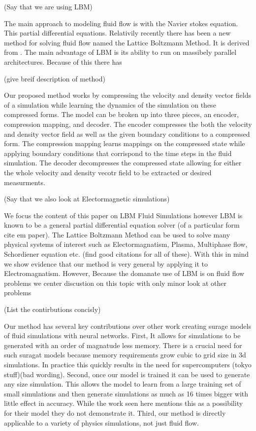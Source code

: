 \documentclass{article}
\begin{document}
(Say that we are using LBM)

The main approach to modeling fluid flow is with the Navier stokes equation. This partial differential equations. Relativily recently there has been a new method for solving fluid flow named the Lattice Boltzmann Method. It is derived from . The main advantage of LBM is its ability to run on massibely parallel architectures. Because of this there has 

(give breif description of method)

Our proposed method works by compressing the velocity and density vector fields of a simulation while learning the dynamics of the simulation on these compressed forms. The model can be broken up into three pieces, an encoder, compression mapping, and decoder. The encoder compresses the both the velocity and density vector field as well as the given boundary conditions to a compressed form. The compression mapping learns mappings on the compressed state while applying boundary conditions that corrispond to the time steps in the fluid simulation. The decoder decompresses the compressed state allowing for either the whole velocity and density vecotr field to be extracted or desired measurments.

(Say that we also look at Electormagnetic simulations)

We focus the content of this paper on LBM Fluid Simulations however LBM is known to be a general partial differential equation solver (of a particular form cite em paper). The Lattice Boltzmann Method can be used to solve many physical systems of interest such as Electormagnatism, Plasma, Multiphase flow, Schordiener equation etc. (find good citations for all of these). With this in mind we show evidence that our method is very general by applying it to Electromagnatism. However, Because the domanate use of LBM is on fluid flow problems we center discustion on this topic with only minor look at other problems

(List the contirbutions concisly)

Our method has several key contributions over other work creating surage models of fluid simulations with neural networks. First, It allows for simulations to be generated with an order of magnatude less memory. There is a crucial need for such suragat models because memory requirements grow cubic to grid size in 3d simulations. In practice this quickly results in the need for supercomputers (tokyo stuff)(bad wording). Second, once our model is trained it can be used to generate any size simulation. This allows the model to learn from a large training set of small simulations and then generate simulations as much as 16 times bigger with little effect in accuracy. While the work seen here mentions this as a possibility for their model they do not demonstrate it. Third, our method is directly applicable to a variety of physics simulations, not just fluid flow.
\end{document}
